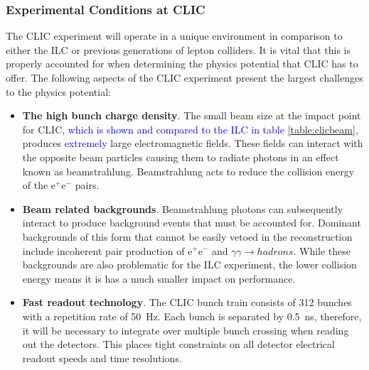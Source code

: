 
\subsubsection{Experimental Conditions at CLIC}
The CLIC experiment will operate in a unique environment in comparison to either the ILC or previous generations of lepton colliders.  It is vital that this is properly accounted for when determining the physics potential that CLIC has to offer.  The following aspects of the CLIC experiment present the largest challenges to the physics potential:

\begin{itemize}
\item \textbf{The high bunch charge density}.  The small beam size at the impact point for CLIC\textcolor{blue}{, which is shown and compared to the ILC in table \ref{table:clicbeam},} produces \textcolor{blue}{extremely} large electromagnetic fields.  These fields can interact with the opposite beam particles causing them to radiate photons in an effect known as beamstrahlung.  Beamstrahlung acts to reduce the collision energy of the $\text{e}^{+}\text{e}^{-}$ pairs.   
\item \textbf{Beam related backgrounds}.  Beamstrahlung photons can subsequently interact to produce background events that must be accounted for.  Dominant backgrounds of this form that cannot be easily vetoed in the reconstruction include incoherent pair production of $\text{e}^{+}\text{e}^{-}$ and $\gamma\gamma \rightarrow hadrons$.  While these backgrounds are also problematic for the ILC experiment, the lower collision energy means it is has a much smaller impact on performance.
\item \textbf{Fast readout technology}.  The CLIC bunch train consists of 312 bunches with a repetition rate of 50~Hz.  Each bunch is separated by 0.5~ns, therefore, it will be necessary to integrate over multiple bunch crossing when reading out the detectors.  This places tight constraints on all detector electrical readout speeds and time resolutions.   
\end{itemize}

